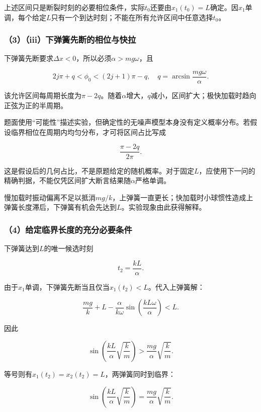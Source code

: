 \documentclass[12pt,a4paper,fontset=fandol]{ctexart}
\begin{document}
上述区间只是断裂时刻的必要相位条件，实际\(t_0\)还要由\(x_1(t_0)=L\)确定。因\(x_1\)单调，每个给定\(L\)只有一个到达时刻；不能在所有允许区间中任意选择\(t_0\)。

\subsubsection{（3）（iii）下弹簧先断的相位与快拉}\label{iiiux4e0bux5f39ux7c27ux5148ux65adux7684ux76f8ux4f4dux4e0eux5febux62c9}

下弹簧先断要求\(\Delta x<0\)，所以必须\(\alpha>mg\omega\)，且

\[
\boxed{
2j\pi+q<\phi_0<(2j+1)\pi-q,\quad
q=\arcsin\frac{mg\omega}{\alpha}}.
\]

该允许区间每周期长度为\(\pi-2q\)。随着\(\alpha\)增大，\(q\)减小，区间扩大；极快加载时趋向正弦为正的半周期。

题面使用``可能性''描述实验，但确定性的无噪声模型本身没有定义概率分布。若假设临界相位在周期内均匀分布，才可将区间占比写成

\[
\frac{\pi-2q}{2\pi}.
\]

这是假设后的几何占比，不是原题给定的随机概率。对于固定\(L\)，应使用下一问的精确判据，不能仅凭区间扩大断言结果随\(\alpha\)严格单调。

慢加载时振动偏离不足以抵消\(mg/k\)，上弹簧一直更长；快加载时小球惯性造成上弹簧长度滞后，下弹簧有机会先达到\(L\)。实验现象由此获得解释。

\subsubsection{（4）给定临界长度的充分必要条件}\label{ux7ed9ux5b9aux4e34ux754cux957fux5ea6ux7684ux5145ux5206ux5fc5ux8981ux6761ux4ef6}

下弹簧达到\(L\)的唯一候选时刻

\[
t_2=\frac{kL}{\alpha}.
\]

由于\(x_1\)单调，下弹簧先断当且仅当\(x_1(t_2)<L\)。代入上弹簧解：

\[
\frac{mg}k+L-\frac{\alpha}{k\omega}
\sin\left(\frac{kL\omega}{\alpha}\right)<L.
\]

因此

\[
\boxed{
\sin\left(\frac{kL}{\alpha}\sqrt{\frac km}\right)
>\frac{mg}{\alpha}\sqrt{\frac km}}.
\]

等号则有\(x_1(t_2)=x_2(t_2)=L\)，两弹簧同时到临界：

\[
\boxed{
\sin\left(\frac{kL}{\alpha}\sqrt{\frac km}\right)
=\frac{mg}{\alpha}\sqrt{\frac km}}.
\]
\end{document}
